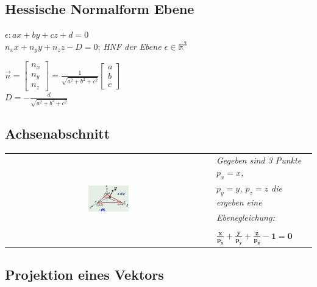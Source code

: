 \subsection{Hessische Normalform Ebene}

$\epsilon: ax + by + cz + d = 0$ \\

$n_x x + n_y y + n_z z - D = 0$;
\textit{HNF der Ebene $\epsilon \in \mathbb{R}^3$}

$\vec{n} = \begin{bmatrix}
    n_x \\
    n_y \\
    n_z
\end{bmatrix} = \frac{1}{\sqrt{a^2 + b^2 + c^2}} \begin{bmatrix}
    a \\
    b \\
    c
\end{bmatrix} $ \\
$D = - \frac{d}{\sqrt{a^2 + b^2 + c^2}}$

\subsection{Achsenabschnitt}

\begin{tabular}{cl}
    \multirow{5}{*}{
        \includegraphics[width=0.2\textwidth]{assets/hnfachsenabschnitt.png}
    }
    & \textit{Gegeben sind 3 Punkte $p_x = x$, } \\
    & \textit{$p_y = y$, $p_z = z$ die ergeben eine } \\
    & \textit{Ebenegleichung:} \\
    & \\
    & $\mathbf{\frac{x}{p_x} + \frac{y}{p_y} + \frac{z}{p_z} - 1 = 0}$ \\
\end{tabular}

\subsection{Projektion eines Vektors}

